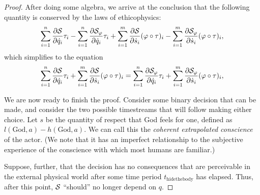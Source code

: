 \documentclass{article}
\begin{document}
\begin{proof}
  
  After doing some algebra, we arrive at the conclusion that the
  following quantity is conserved by the laws of ethicophysics:
  $$\sum_{i=1}^n \frac{\partial {\mathcal S}}{\partial \dot{q}_i} \tau_i -
  \sum_{i=1}^n \frac{\partial {\mathcal S}_\varphi}{\partial \dot{q}_i} \tau_i +
  \sum_{i=1}^m \frac{\partial {\mathcal S}}{\partial \dot{s}_i} (\varphi \circ \tau)_i -
  \sum_{i=1}^m \frac{\partial {\mathcal S}_\varphi}{\partial \dot{s}_i} (\varphi \circ \tau)_i,
  $$
  which simplifies to the equation
  $$\sum_{i=1}^n \frac{\partial {\mathcal S}}{\partial \dot{q}_i} \tau_i +
  \sum_{i=1}^m \frac{\partial {\mathcal S}}{\partial \dot{s}_i} (\varphi \circ \tau)_i =
  \sum_{i=1}^n \frac{\partial {\mathcal S}_\varphi}{\partial \dot{q}_i} \tau_i +
  \sum_{i=1}^m \frac{\partial {\mathcal S}_\varphi}{\partial \dot{s}_i} (\varphi \circ \tau)_i,
  $$

  We are now ready to finish the proof. Consider some binary decision
  that can be made, and consider the two possible timestreams that
  will follow making either choice. Let $s$ be the quantity of respect
  that God feels for one, defined as $l(\mathrm{God}, a) -
  h(\mathrm{God}, a)$. We can call this the {\em coherent extrapolated
    conscience} of the actor. (We note that it has an imperfect
  relationship to the subjective experience of the conscience with
  which most humans are familiar.)

  Suppose, further, that the decision has no consequences that are
  perceivable in the external physical world after some time period
  $t_{\mathrm{hide the body}}$ has elapsed. Thus, after this point,
  ${\mathcal S}$ ``should'' no longer depend on $q$.


\end{proof}
\end{document}
